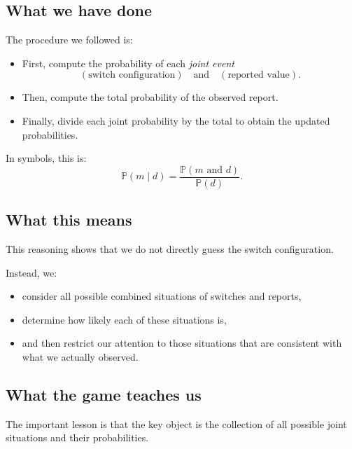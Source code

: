 \documentclass[11pt]{article}
\theoremstyle{remark}
\begin{document}
\vspace{2mm}

\subsection{What we have done}

The procedure we followed is:

\begin{itemize}
    \item First, compute the probability of each \emph{joint event}
    \[
    (\text{switch configuration}) \quad \text{and} \quad (\text{reported value}).
    \]
    \item Then, compute the total probability of the observed report.
    \item Finally, divide each joint probability by the total to obtain the updated probabilities.
\end{itemize}

In symbols, this is:
\[
\mathbb P(m \mid d)
=
\frac{\mathbb P(m \text{ and } d)}{\mathbb P(d)}.
\]

\vspace{2mm}

\subsection{What this means}

This reasoning shows that we do not directly guess the switch configuration.

Instead, we:

\begin{itemize}
    \item consider all possible combined situations of switches and reports,
    \item determine how likely each of these situations is,
    \item and then restrict our attention to those situations that are consistent with what we actually observed.
\end{itemize}

\vspace{2mm}

\subsection{What the game teaches us}

The important lesson is that the key object is the collection of all possible joint situations and their probabilities.
\end{document}

